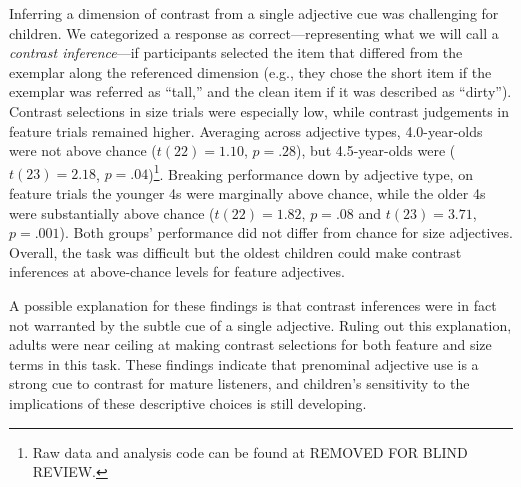 \documentclass[man]{apa2}
\begin{document}
Inferring a dimension of contrast from a single adjective cue was challenging for children. We categorized a response as correct---representing what we will call a \emph{contrast inference}---if participants selected the item that differed from the exemplar along the referenced dimension (e.g., they chose the short item if the exemplar was referred as ``tall,'' and the clean item if it was described as ``dirty'').  Contrast selections in size trials were especially low, while contrast judgements in feature trials remained higher. Averaging across adjective types, 4.0-year-olds were not above chance ($t(22) = 1.10$, $p = .28$), but 4.5-year-olds were ($t(23)=2.18$, $p = .04$)\footnote{Raw data and analysis code can be found at REMOVED FOR BLIND REVIEW.}. Breaking performance down by adjective type, on feature trials the younger 4s were marginally above chance, while the older 4s were substantially above chance ($t(22) = 1.82$, $p = .08$ and $t(23)=3.71$, $p = .001$). Both groups' performance did not differ from chance for size adjectives. Overall, the task was difficult but the oldest children could make contrast inferences at above-chance levels for feature adjectives. 


A possible explanation for these findings is that contrast inferences were in fact not warranted by the subtle cue of a single adjective. Ruling out this explanation, adults were near ceiling at making contrast selections for both feature and size terms in this task. These findings indicate that prenominal adjective use is a strong cue to contrast for mature listeners, and children's sensitivity to the implications of these descriptive choices is still developing.




\end{document}
